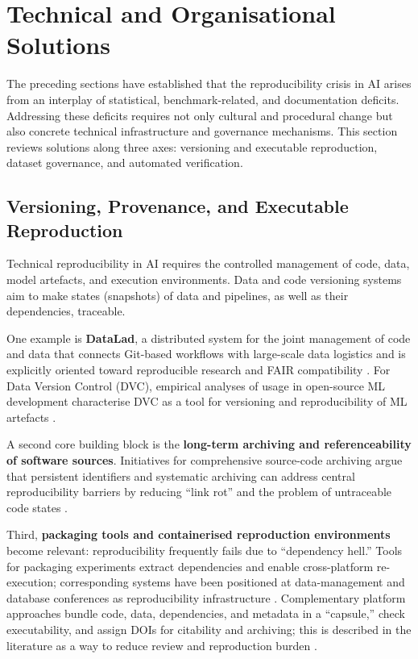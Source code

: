 \documentclass[12pt, a4paper]{article}
\begin{document}
\section{Technical and Organisational Solutions}
\label{sec:solutions}

The preceding sections have established that the reproducibility crisis
in AI arises from an interplay of statistical, benchmark-related, and
documentation deficits.  Addressing these deficits requires not only
cultural and procedural change but also concrete technical
infrastructure and governance mechanisms.  This section reviews solutions
along three axes: versioning and executable reproduction, dataset
governance, and automated verification.

\subsection{Versioning, Provenance, and Executable Reproduction}
\label{sec:versioning}

Technical reproducibility in AI requires the controlled management of
code, data, model artefacts, and execution environments.  Data and code
versioning systems aim to make states (snapshots) of data and pipelines,
as well as their dependencies, traceable.

One example is \textbf{DataLad}, a distributed system for the joint
management of code and data that connects Git-based workflows with
large-scale data logistics and is explicitly oriented toward
reproducible research and FAIR compatibility \cite{Halchenko2021}.  For
Data Version Control (DVC), empirical analyses of usage in open-source
ML development characterise DVC as a tool for versioning and
reproducibility of ML artefacts \cite{Pacheco2024}.

A second core building block is the \textbf{long-term archiving and
referenceability of software sources}.  Initiatives for comprehensive
source-code archiving argue that persistent identifiers and systematic
archiving can address central reproducibility barriers by reducing
``link rot'' and the problem of untraceable code states
\cite{DiCosmo2018}.

Third, \textbf{packaging tools and containerised reproduction
environments} become relevant: reproducibility frequently fails due to
``dependency hell.''  Tools for packaging experiments extract
dependencies and enable cross-platform re-execution; corresponding
systems have been positioned at data-management and database conferences
as reproducibility infrastructure \cite{Chirigati2016,Rampin2018}.
Complementary platform approaches bundle code, data, dependencies, and
metadata in a ``capsule,'' check executability, and assign DOIs for
citability and archiving; this is described in the literature as a way
to reduce review and reproduction burden \cite{Cheifet2021}.
\end{document}
